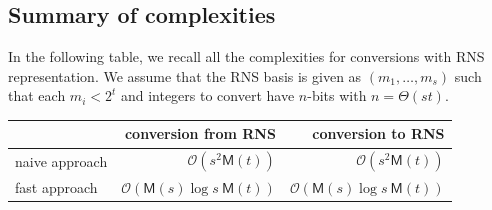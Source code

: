 \documentclass[acmtoms]{acmsmall}
\def\M{\mathsf{M}}
\def\I{\mathsf{I}}
\def\bigO{{\ensuremath{\mathcal{O}}}}
\newcommand{\tmop}[1]{\ensuremath{\operatorname{#1}}}
\newcommand{\assign}{:=}
\newcommand{\rem}{\tmop{rem}}
\begin{document}



\subsection{Summary of complexities}

In the following table, we recall all the complexities for conversions with RNS representation. We assume that the RNS basis is given as $(m_1,\dots,m_s)$ such that each $m_i<2^t$ and integers to
convert have $n$-bits with $n=\Theta(st)$.

\begin{table}[h]
\centering
\begin{tabular}{|l|r|r|}
\hline
               & conversion from RNS & conversion to RNS\\
\hline
naive approach & $\bigO(s^2\M(t))$ & $\bigO(s^2\M(t))$\\
fast approach  & $\bigO(\M(s)\log s~\M(t))$ & $\bigO(\M(s)\log s~\M(t))$ \\
\hline
\end{tabular}
\end{table}
\end{document}
